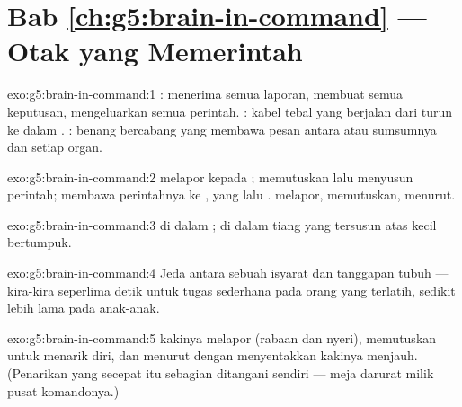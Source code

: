 \section*{Bab \ref{ch:g5:brain-in-command} --- Otak yang Memerintah}

\begin{solution}{exo:g5:brain-in-command:1}
: menerima semua laporan, membuat semua keputusan, mengeluarkan
semua perintah. : kabel tebal yang berjalan dari
 turun ke dalam . : benang bercabang yang
membawa pesan antara  atau sumsumnya dan setiap organ.
\end{solution}

\begin{solution}{exo:g5:brain-in-command:2}
 melapor kepada ;  memutuskan lalu menyusun
perintah;  membawa perintahnya ke , yang lalu .
 melapor,  memutuskan,  menurut.
\end{solution}

\begin{solution}{exo:g5:brain-in-command:3}
 di dalam ;  di dalam tiang
 yang tersusun atas  kecil bertumpuk.
\end{solution}

\begin{solution}{exo:g5:brain-in-command:4}
Jeda antara sebuah isyarat dan tanggapan tubuh --- kira-kira seperlima
detik untuk tugas sederhana pada orang yang terlatih, sedikit lebih
lama pada anak-anak.
\end{solution}

\begin{solution}{exo:g5:brain-in-command:5}
 kakinya melapor (rabaan dan nyeri),  memutuskan
untuk menarik diri, dan   menurut dengan menyentakkan
kakinya menjauh. (Penarikan yang secepat itu sebagian ditangani  sendiri --- meja darurat milik pusat komandonya.)
\end{solution}

